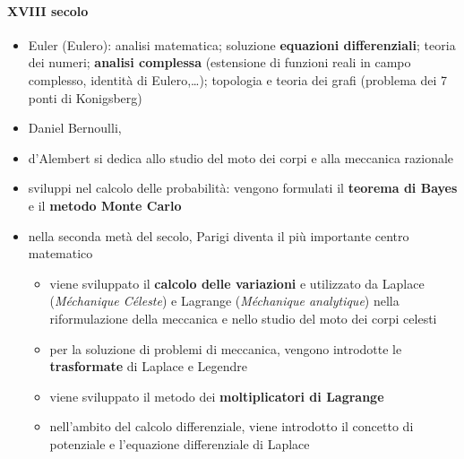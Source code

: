 \paragraph{XVIII secolo}
\begin{itemize}
    \item Euler (Eulero): analisi matematica; soluzione \textbf{equazioni differenziali}; teoria dei numeri; \textbf{analisi complessa} (estensione di funzioni reali in campo complesso, identità di Eulero,\dots); topologia e teoria dei grafi (problema dei 7 ponti di Konigsberg)
    \item {\color{red} Daniel Bernoulli,}
    \item {\color{red} d'Alembert si dedica allo studio del moto dei corpi e alla meccanica razionale}
    \item sviluppi nel calcolo delle probabilità: vengono formulati il \textbf{teorema di Bayes} e il \textbf{metodo Monte Carlo}
    \item nella seconda metà del secolo, Parigi diventa il più importante centro matematico
        \begin{itemize}
            \item viene sviluppato il \textbf{calcolo delle variazioni} e utilizzato da Laplace (\textit{Méchanique Céleste}) e Lagrange (\textit{Méchanique analytique}) nella riformulazione della meccanica e nello studio del moto dei corpi celesti
            \item per la soluzione di problemi di meccanica, vengono introdotte le \textbf{trasformate} di Laplace e Legendre
            \item viene sviluppato il metodo dei \textbf{moltiplicatori di Lagrange}
            \item nell'ambito del calcolo differenziale, viene introdotto il concetto di potenziale e l'equazione differenziale di Laplace
        \end{itemize}
\end{itemize}
